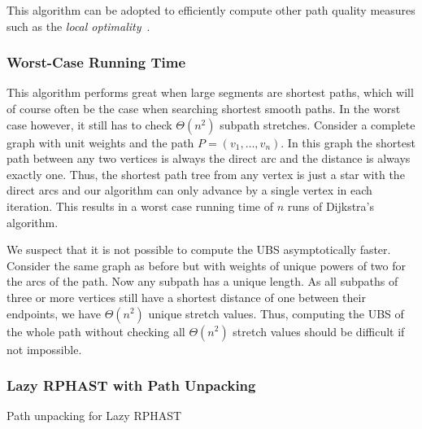 \documentclass[a4paper,UKenglish,cleveref, autoref, thm-restate]{lipics-v2021}
\begin{document}

This algorithm can be adopted to efficiently compute other path quality measures such as the \emph{local optimality}~\cite{adgw-arrn-13}.

\subsubsection{Worst-Case Running Time}

This algorithm performs great when large segments are shortest paths, which will of course often be the case when searching shortest smooth paths.
In the worst case however, it still has to check $\Theta(n^2)$ subpath stretches.
Consider a complete graph with unit weights and the path $P=(v_1, \dots, v_n)$.
In this graph the shortest path between any two vertices is always the direct arc and the distance is always exactly one.
Thus, the shortest path tree from any vertex is just a star with the direct arcs and our algorithm can only advance by a single vertex in each iteration.
This results in a worst case running time of $n$ runs of Dijkstra's algorithm.

We suspect that it is not possible to compute the UBS asymptotically faster.
Consider the same graph as before but with weights of unique powers of two for the arcs of the path.
Now any subpath has a unique length.
As all subpaths of three or more vertices still have a shortest distance of one between their endpoints, we have $\Theta(n^2)$ unique stretch values.
Thus, computing the UBS of the whole path without checking all $\Theta(n^2)$ stretch values should be difficult if not impossible.

\subsubsection{Lazy RPHAST with Path Unpacking}
\label{sec:lazy_rphast_path}

\begin{algorithm2e}[t]

\caption{Path unpacking for Lazy RPHAST}
\label{algo:lazy_rphast_path}
\end{algorithm2e}
\end{document}
